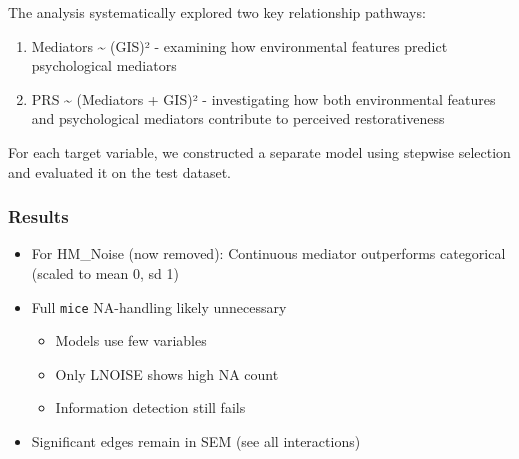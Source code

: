 \documentclass[
  letterpaper,
  DIV=11,
  numbers=noendperiod]{scrartcl}
\providecommand{\tightlist}{%
  \setlength{\itemsep}{0pt}\setlength{\parskip}{0pt}}
\begin{document}
The analysis systematically explored two key relationship pathways:

\begin{enumerate}
\def\labelenumi{\arabic{enumi}.}
\tightlist
\item
  Mediators \textasciitilde{} (GIS)² - examining how environmental
  features predict psychological mediators
\item
  PRS \textasciitilde{} (Mediators + GIS)² - investigating how both
  environmental features and psychological mediators contribute to
  perceived restorativeness
\end{enumerate}

For each target variable, we constructed a separate model using stepwise
selection and evaluated it on the test dataset.

\subsubsection{Results}\label{results-1}

\begin{itemize}
\tightlist
\item
  For HM\_Noise (now removed): Continuous mediator outperforms
  categorical (scaled to mean 0, sd 1)
\item
  Full \texttt{mice} NA-handling likely unnecessary

  \begin{itemize}
  \tightlist
  \item
    Models use few variables
  \item
    Only LNOISE shows high NA count
  \item
    Information detection still fails
  \end{itemize}
\item
  Significant edges remain in SEM (see all interactions)
\end{itemize}
\end{document}
